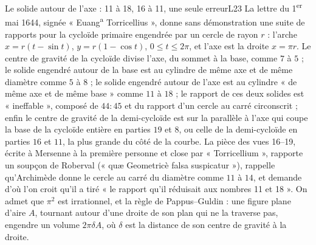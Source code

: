 \documentclass[11pt,a4paper]{article}
\begin{document}
\begin{exercice}{Le solide autour de l'axe : 11 à 18, 16 à 11, une seule erreur}{L2}{3}
La lettre du 1\textsuperscript{er} mai 1644, signée « Euang\textsuperscript{a}
Torricellius », donne sans démonstration une suite de rapports pour la cycloïde
primaire engendrée par un cercle de rayon $r$ : l'arche
$x = r(t - \sin t)$, $y = r(1 - \cos t)$, $0 \le t \le 2\pi$, et l'axe est la droite
$x = \pi r$. Le centre de gravité de la cycloïde divise l'axe, du sommet à la base,
comme $7$ à $5$ ; le solide engendré autour de la base est au cylindre de même axe
et de même diamètre comme $5$ à $8$ ; le solide engendré autour de l'axe est au
cylindre « de même axe et de même base » comme $11$ à $18$ ; le rapport de ces deux
solides est « ineffable », composé de $44 : 45$ et du rapport d'un cercle au carré
circonscrit ; enfin le centre de gravité de la demi-cycloïde est sur la parallèle
à l'axe qui coupe la base de la cycloïde entière en parties $19$ et $8$, ou celle de
la demi-cycloïde en parties $16$ et $11$, la plus grande du côté de la courbe. La
pièce des vues 16--19, écrite à Mersenne à la première personne et close par
« Torricellium », rapporte un soupçon de Roberval (« quæ Geometricè falsa
suspicatur »), rappelle qu'Archimède donne le cercle au carré du diamètre comme
$11$ à $14$, et demande d'où l'on croit qu'il a tiré « le rapport qu'il réduisait
aux nombres 11 et 18 ». On admet que $\pi^2$ est irrationnel, et la règle de
Pappus--Guldin : une figure plane d'aire $A$, tournant autour d'une droite de son
plan qui ne la traverse pas, engendre un volume $2\pi\delta A$, où $\delta$ est la
distance de son centre de gravité à la droite.



\end{exercice}
\end{document}
